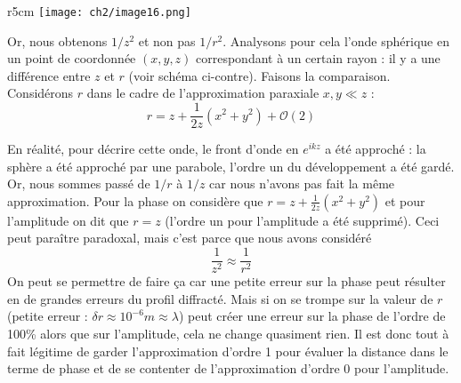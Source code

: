 \begin{wrapfigure}[9]{r}{5cm}
\vspace{-5mm}
\texttt{[image: ch2/image16.png]}
\end{wrapfigure}
Or, nous obtenons $1/z^2$ et non pas $1/r^2$. Analysons pour cela l'onde sphérique en un 
point de coordonnée $(x,y,z)$ correspondant à un certain rayon : il y a une différence 
entre $z$ et $r$ (voir schéma ci-contre). Faisons la comparaison. Considérons $r$ dans le 
cadre de l'approximation paraxiale $x,y \ll z$ :
\begin{equation}
r = z+\frac{1}{2z}(x^2+y^2) + \mathcal{O}(2)
\end{equation}



En réalité, pour décrire cette onde, le front d'onde en $e^{ikz}$ a été approché : la 
sphère a été approché par une parabole, l'ordre un du développement a été gardé. Or, nous 
sommes passé de $1/r$ à $1/z$ car nous n'avons pas fait la même 
approximation. Pour la phase on considère que $r = z +\frac{1}{2z}(x^2+y^2)$ et pour l'amplitude 
on dit que $r=z$ (l'ordre un pour l'amplitude a été supprimé). Ceci peut paraître paradoxal, 
mais c'est parce que nous avons considéré 
\begin{equation}
\frac{1}{z^2}\approx\frac{1}{r^2}
\end{equation}
On peut se permettre de faire ça car une petite erreur sur la phase peut résulter en de 
grandes erreurs du profil diffracté. Mais si on se trompe sur la valeur de $r$ (petite 
erreur : $\delta r \approx 10^{-6}m\approx \lambda$) peut créer une erreur sur la phase 
de l'ordre de 100\% alors que sur l'amplitude, cela ne change quasiment rien. Il est donc 
tout à fait légitime de garder l'approximation d'ordre 1 pour évaluer la distance dans le 
terme de phase et de se contenter de l'approximation d'ordre 0 pour l'amplitude.



\newpage
